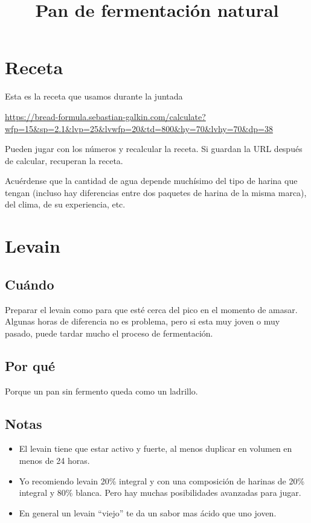 \documentclass[10pt,a4paper]{article}
\title{Pan de fermentación natural}
\begin{document}
\maketitle
\tableofcontents

\section{Receta}
Esta es la receta que usamos durante la juntada

\url{https://bread-formula.sebastian-galkin.com/calculate?wfp=15&sp=2.1&lvp=25&lvwfp=20&td=800&hy=70&lvhy=70&dp=38}

Pueden jugar con los números y recalcular la receta.  Si guardan la URL
después de calcular, recuperan la receta.

Acuérdense que la cantidad de agua depende muchísimo del tipo de harina que
tengan (incluso hay diferencias entre dos paquetes de harina de la misma marca),
del clima, de su experiencia, etc.

\section{Levain}
\subsection*{Cuándo}
Preparar el levain como para que esté cerca del pico en el momento de amasar.
Algunas horas de diferencia no es problema, pero si esta muy joven o muy pasado,
puede tardar mucho el proceso de fermentación.

\subsection*{Por qué}
Porque un pan sin fermento queda como un ladrillo.

\subsection*{Notas}
\begin{itemize}
\item El levain tiene que estar activo y fuerte, al menos duplicar en
  volumen en menos de 24 horas.
\item Yo recomiendo levain 20\% integral y con una composición de harinas de
  20\% integral y 80\% blanca. Pero hay muchas posibilidades avanzadas para jugar.
\item En general un levain ``viejo'' te da un sabor mas ácido que uno joven.
\end{itemize}
\end{document}
